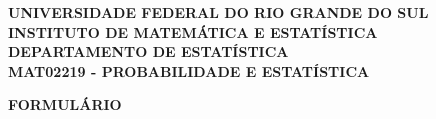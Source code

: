 \documentclass[10pt]{article}%
\begin{document}
\begin{center}
{\bf 
UNIVERSIDADE FEDERAL DO RIO GRANDE DO SUL\\
INSTITUTO DE MATEMÁTICA E ESTATÍSTICA\\
DEPARTAMENTO DE ESTATÍSTICA\\
MAT02219 - PROBABILIDADE E ESTATÍSTICA}\\
\vspace*{0.1cm}{\bf ÁREA 3}
\end{center}
%
\begin{center}
{\bf FORMULÁRIO}
\end{center}
\end{document}
